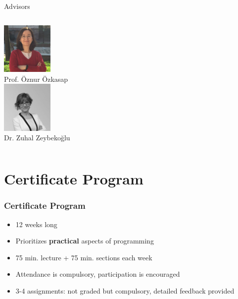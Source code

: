 \begin{frame}{Advisors}
\begin{columns}
        \column{3.333cm}
          \centering
          \includegraphics[width=2.5cm]{images/oozkasap.jpg}\\
          Prof. Öznur Özkasap\\
          \vspace{2.5mm}
          \includegraphics[width=2.5cm]{images/zzeybekoglu.jpg}\\
          Dr. Zuhal Zeybekoğlu\\
			\end{columns}
    
    \end{frame}

    \section{Certificate Program}
      \begin{frame}
        \frametitle{Certificate Program}
        \LARGE
        \pause
        \begin{itemize}
          \item 12 weeks long
          \pause
          \item Prioritizes \textbf{practical} aspects of programming
          \pause
          \item 75 min. lecture + 75 min. sections each week
          \pause
          \item Attendance is compulsory, participation is encouraged 
          \pause
          \item 3-4 assignments: not graded but compulsory, detailed feedback provided
        \end{itemize}

      \end{frame}

